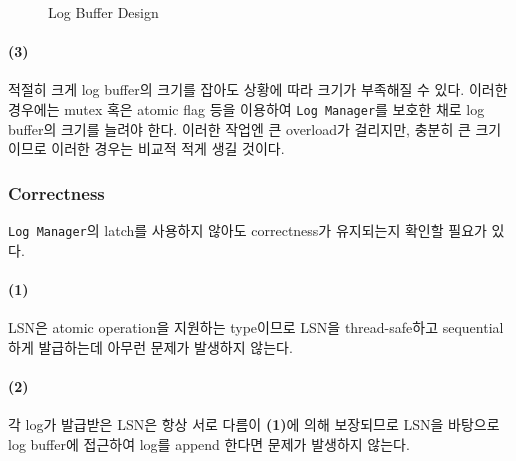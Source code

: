\documentclass[main.tex]{subfiles}
\begin{document}
\begin{figure}[!hbp]
	\centering
	\hspace{10px}
	\hspace{10px} 
	\caption{Log Buffer Design}
\end{figure}

\paragraph{(3)}
적절히 크게 log buffer의 크기를 잡아도 상황에 따라 크기가 부족해질 수 있다.
이러한 경우에는 mutex 혹은 atomic flag 등을 이용하여 \texttt{Log Manager}를 보호한 채로 log buffer의 크기를 늘려야 한다.
이러한 작업엔 큰 overload가 걸리지만, 충분히 큰 크기이므로 이러한 경우는 비교적 적게 생길 것이다.


\subsubsection{Correctness}
\noindent \texttt{Log Manager}의 latch를 사용하지 않아도 correctness가 유지되는지 확인할 필요가 있다.

\paragraph{(1)}
LSN은 atomic operation을 지원하는 type이므로 LSN을 thread-safe하고 sequential 하게 발급하는데 아무런 문제가 발생하지 않는다.

\paragraph{(2)}
각 log가 발급받은 LSN은 항상 서로 다름이 \textbf{(1)}에 의해 보장되므로 LSN을 바탕으로 log buffer에 접근하여 log를 append 한다면 문제가 발생하지 않는다.
\end{document}
